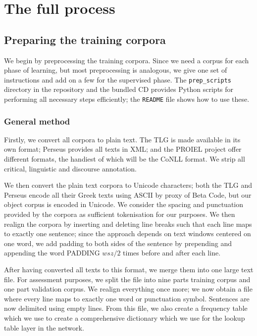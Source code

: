 \section{The full process}
\label{sec:process}
\subsection{Preparing the training corpora}
\label{sec:trainingcorpora}
We begin by preprocessing the training corpora. Since we need a corpus
for each phase of learning, but most preprocessing is analogous, we
give one set of instructions and add on a few for the supervised
phase. The \texttt{prep\_scripts} directory in the repository and the
bundled CD provides Python scripts for performing all necessary steps
efficiently; the \texttt{README} file shows how to use these.

\subsubsection{General method}
\label{sec:supcorp}
Firstly, we convert all corpora to plain text. The TLG is made
available in its own format; Perseus provides all texts in XML; and
the PROIEL project offer different formats, the handiest of which will
be the CoNLL format. We strip all critical, linguistic and discourse
annotation.

We then convert the plain text corpora to Unicode characters; both the
TLG and Perseus encode all their Greek texts using ASCII by proxy of
Beta Code, but our object corpus is encoded in Unicode. We consider
the spacing and punctuation provided by the corpora as sufficient
tokenisation for our purposes. We then realign the corpora by
inserting and deleting line breaks such that each line maps to exactly
one sentence; since the approach depends on text windows centered on
one word, we add padding to both sides of the sentence by prepending
and appending the word PADDING $wsz / 2$ times before and after each
line.

After having converted all texts to this format, we merge them into
one large text file. For assessment purposes, we split the file into
nine parts training corpus and one part validation corpus. We realign
everything once more; we now obtain a file where every line maps
to exactly one word or punctuation symbol. Sentences are now delimited
using empty lines. From this file, we also create a frequency table
which we use to create a comprehensive dictionary which we use for the
lookup table layer in the network.

